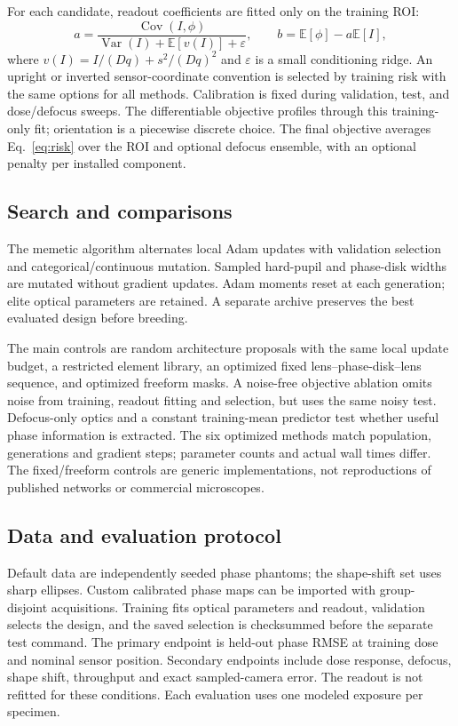 \documentclass[11pt]{article}
\begin{document}
For each candidate, readout coefficients are fitted only on the training ROI:
\begin{equation}
 a=\frac{\operatorname{Cov}(I,\phi)}{\operatorname{Var}(I)+
       \mathbb E[v(I)]+\varepsilon},\qquad
 b=\mathbb E[\phi]-a\mathbb E[I],
\end{equation}
where $v(I)=I/(Dq)+s^2/(Dq)^2$ and $\varepsilon$ is a small conditioning ridge.
An upright or inverted sensor-coordinate convention is selected by training
risk with the same options for all methods. Calibration is fixed during
validation, test, and dose/defocus sweeps. The differentiable objective profiles
through this training-only fit; orientation is a piecewise discrete choice.
The final objective averages Eq.~\ref{eq:risk} over the ROI and optional defocus
ensemble, with an optional penalty per installed component.

\subsection{Search and comparisons}
The memetic algorithm alternates local Adam updates with validation selection
and categorical/continuous mutation. Sampled hard-pupil and phase-disk widths
are mutated without gradient updates. Adam moments reset at each generation;
elite optical parameters are retained. A separate archive preserves the best
evaluated design before breeding.

The main controls are random architecture proposals with the same local update
budget, a restricted element library, an optimized fixed lens--phase-disk--lens
sequence, and optimized freeform masks. A noise-free objective ablation omits
noise from training, readout fitting and selection, but uses the same noisy test.
Defocus-only optics and a constant training-mean predictor test whether useful
phase information is extracted. The six optimized methods match population,
generations and gradient steps; parameter counts and actual wall times differ.
The fixed/freeform controls are generic implementations, not reproductions of
published networks or commercial microscopes.

\subsection{Data and evaluation protocol}
Default data are independently seeded phase phantoms; the shape-shift set uses
sharp ellipses. Custom calibrated phase maps can be imported with group-disjoint
acquisitions. Training fits optical parameters and readout, validation selects
the design, and the saved selection is checksummed before the separate test
command. The primary endpoint is held-out phase RMSE at training dose and nominal
sensor position. Secondary endpoints include dose response, defocus, shape shift,
throughput and exact sampled-camera error. The readout is not refitted for these
conditions. Each evaluation uses one modeled exposure per specimen.
\end{document}
